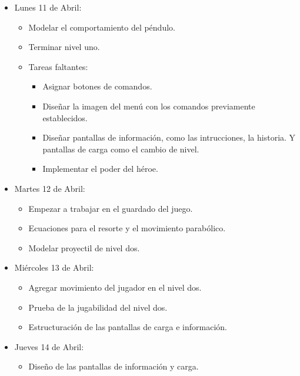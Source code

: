 \documentclass{article}
\begin{document}
\begin{itemize}
    \item Lunes 11 de Abril:
    \begin{itemize}
        \item Modelar el comportamiento del péndulo.
        \item Terminar nivel uno.
        
        \item Tareas faltantes:
        \begin{itemize}
            \item Asignar botones de comandos.
            \item Diseñar la imagen del menú con los comandos previamente establecidos.
            \item Diseñar pantallas de información, como las intrucciones, la historia. Y pantallas de carga como el cambio de nivel.
            \item Implementar el poder del héroe.
        \end{itemize}
    \end{itemize}
    
    \item Martes 12 de Abril:
    \begin{itemize}
        \item Empezar a trabajar en el guardado del juego.
        \item Ecuaciones para el resorte y el movimiento parabólico.
        \item Modelar proyectil de nivel dos.
    \end{itemize}
    
    \item Miércoles 13 de Abril:
    \begin{itemize}
        \item Agregar movimiento del jugador en el nivel dos.
        \item Prueba de la jugabilidad del nivel dos.
        \item Estructuración de las pantallas de carga e información.
    \end{itemize}
    
    \item Jueves 14 de Abril:
    \begin{itemize}
        \item Diseño de las pantallas de información y carga.
    \end{itemize}
    
    
\end{itemize}
\end{document}
